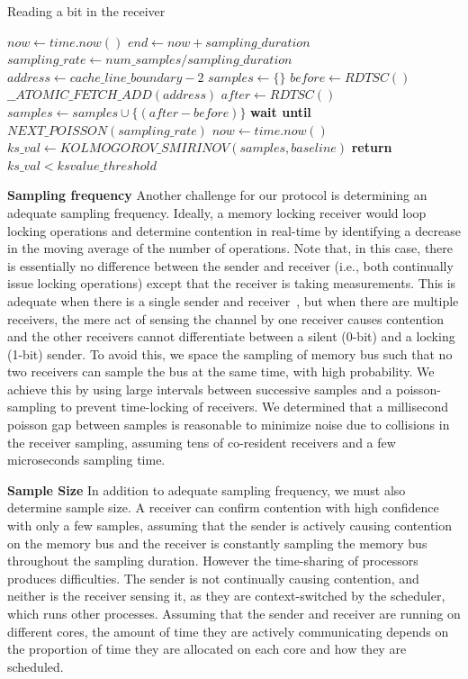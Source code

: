 \begin{algorithm}[!t]
\caption{Reading a bit in the receiver}
\label{alg:receiver}
\begin{algorithmic}[1]
\STATE $now \leftarrow  time.now()$
\STATE $end \leftarrow now + sampling\_duration$
\STATE $sampling\_rate \leftarrow num\_samples / sampling\_duration$
\STATE $address \leftarrow cache\_line\_boundary-2$
\STATE $samples \leftarrow \{\} $
    \STATE $before \leftarrow RDTSC()$
    \STATE $\_\_ATOMIC\_FETCH\_ADD(address)$
    \STATE $after \leftarrow RDTSC()$
    \STATE $samples \leftarrow samples \cup \{(after-before)\}$
    \STATE \textbf{wait until} $NEXT\_POISSON(sampling\_rate)$
    \STATE $now \leftarrow  time.now()$
\ENDWHILE
\STATE $ks\_val \leftarrow KOLMOGOROV\_SMIRINOV(samples, baseline)$
\STATE \textbf{return} $ks\_val < ksvalue\_threshold$
\end{algorithmic}
\end{algorithm}


\textbf{Sampling frequency}
\label{sec:method:listen:freq}
Another challenge for our protocol is determining an adequate sampling
frequency. Ideally, a memory locking receiver would loop locking operations and
determine contention in real-time by identifying a decrease in the moving
average of the number of operations. Note that, in this case, there is
essentially no difference between the sender and receiver (i.e., both
continually issue locking operations) except that the receiver is taking
measurements. This is adequate when there is a single sender and
receiver~\cite{varadarajan2015}, but when there are multiple receivers, the mere
act of sensing the channel by one receiver causes contention and the other receivers
cannot differentiate between a silent (0-bit) and a locking (1-bit) sender. To
avoid this, we space the sampling of memory bus such that no two receivers can 
sample the bus at the same time, with high probability. We achieve this by
using large intervals between successive samples and a poisson-sampling to
prevent time-locking of receivers. We determined that a millisecond poisson gap
between samples is reasonable to minimize noise due to collisions in the receiver
sampling, assuming tens of co-resident receivers and a few
microseconds sampling time.

\textbf{Sample Size} 
\label{sec:method:samplingdur}
In addition to adequate sampling frequency, we must also determine sample size.  
A receiver can confirm contention with high confidence with only a
few samples, assuming that the sender is actively causing contention on the
memory bus and the receiver is constantly sampling the memory bus throughout the
sampling duration. However the time-sharing of processors
produces difficulties. The sender is not continually causing contention, and
neither is the receiver sensing it, as they are context-switched by the
scheduler, which runs other processes. Assuming that the sender and receiver are
running on different cores, the amount of time they are actively communicating
depends on the proportion of time they are allocated on each core and how they
are scheduled. 

